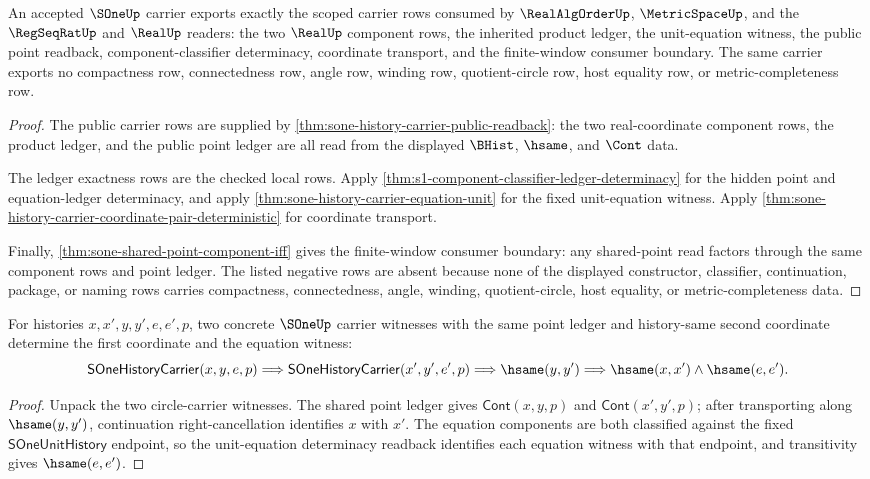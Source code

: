 \begin{theorem}
\label{thm:sone-scoped-carrier-package}
An accepted $\SOneUp$ carrier exports exactly the scoped carrier rows consumed by
$\RealAlgOrderUp$, $\MetricSpaceUp$, and the $\RegSeqRatUp$ and $\RealUp$
readers: the two $\RealUp$ component rows, the inherited product ledger, the
unit-equation witness, the public point readback, component-classifier
determinacy, coordinate transport, and the finite-window consumer boundary.
The same carrier exports no compactness row, connectedness row, angle row,
winding row, quotient-circle row, host equality row, or metric-completeness row.
\end{theorem}
\begin{proof}
The public carrier rows are supplied by
\autoref{thm:sone-history-carrier-public-readback}: the two real-coordinate
component rows, the product ledger, and the public point ledger are all read
from the displayed $\BHist$, $\hsame$, and $\Cont$ data.

The ledger exactness rows are the checked local rows. Apply
\autoref{thm:s1-component-classifier-ledger-determinacy} for the hidden point
and equation-ledger determinacy, and apply
\autoref{thm:sone-history-carrier-equation-unit} for the fixed unit-equation
witness. Apply \autoref{thm:sone-history-carrier-coordinate-pair-deterministic}
for coordinate transport.

Finally, \autoref{thm:sone-shared-point-component-iff} gives the finite-window
consumer boundary: any shared-point read factors through the same component
rows and point ledger. The listed negative rows are absent because none of the
displayed constructor, classifier, continuation, package, or naming rows carries
compactness, connectedness, angle, winding, quotient-circle, host equality, or
metric-completeness data.
\end{proof}

\begin{theorem}
\label{thm:sone-history-carrier-coordinate-pair-deterministic}
For histories $x,x',y,y',e,e',p$, two concrete $\SOneUp$ carrier witnesses with
the same point ledger and history-same second coordinate determine the first
coordinate and the equation witness:
$$
\mathsf{SOneHistoryCarrier}(x,y,e,p)
\Longrightarrow
\mathsf{SOneHistoryCarrier}(x',y',e',p)
\Longrightarrow
\hsame(y,y')
\Longrightarrow
\hsame(x,x')\land\hsame(e,e').
$$
\end{theorem}
\begin{proof}
Unpack the two circle-carrier witnesses. The shared point ledger gives
$\mathsf{Cont}(x,y,p)$ and $\mathsf{Cont}(x',y',p)$; after transporting along
$\hsame(y,y')$, continuation right-cancellation identifies $x$ with $x'$.
The equation components are both classified against the fixed
$\mathsf{SOneUnitHistory}$ endpoint, so the unit-equation determinacy readback
identifies each equation witness with that endpoint, and transitivity gives
$\hsame(e,e')$.
\end{proof}

